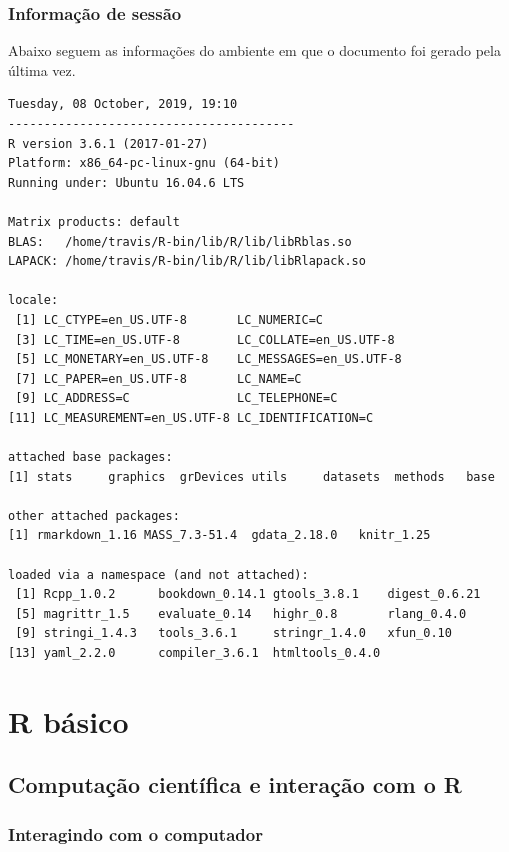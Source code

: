 \documentclass[10pt,a4paper]{book}
\begin{document}
\section*{Informação de sessão}\label{informauxe7uxe3o-de-sessuxe3o}


Abaixo seguem as informações do ambiente em que o documento foi gerado
pela última vez.

\begin{verbatim}
Tuesday, 08 October, 2019, 19:10
----------------------------------------
R version 3.6.1 (2017-01-27)
Platform: x86_64-pc-linux-gnu (64-bit)
Running under: Ubuntu 16.04.6 LTS

Matrix products: default
BLAS:   /home/travis/R-bin/lib/R/lib/libRblas.so
LAPACK: /home/travis/R-bin/lib/R/lib/libRlapack.so

locale:
 [1] LC_CTYPE=en_US.UTF-8       LC_NUMERIC=C              
 [3] LC_TIME=en_US.UTF-8        LC_COLLATE=en_US.UTF-8    
 [5] LC_MONETARY=en_US.UTF-8    LC_MESSAGES=en_US.UTF-8   
 [7] LC_PAPER=en_US.UTF-8       LC_NAME=C                 
 [9] LC_ADDRESS=C               LC_TELEPHONE=C            
[11] LC_MEASUREMENT=en_US.UTF-8 LC_IDENTIFICATION=C       

attached base packages:
[1] stats     graphics  grDevices utils     datasets  methods   base     

other attached packages:
[1] rmarkdown_1.16 MASS_7.3-51.4  gdata_2.18.0   knitr_1.25    

loaded via a namespace (and not attached):
 [1] Rcpp_1.0.2      bookdown_0.14.1 gtools_3.8.1    digest_0.6.21  
 [5] magrittr_1.5    evaluate_0.14   highr_0.8       rlang_0.4.0    
 [9] stringi_1.4.3   tools_3.6.1     stringr_1.4.0   xfun_0.10      
[13] yaml_2.2.0      compiler_3.6.1  htmltools_0.4.0
\end{verbatim}

\part{R básico}\label{part-r-buxe1sico}

\chapter{Computação científica e interação com o
R}\label{computauxe7uxe3o-cientuxedfica-e-interauxe7uxe3o-com-o-r}

\section{Interagindo com o
computador}\label{interagindo-com-o-computador}
\end{document}
